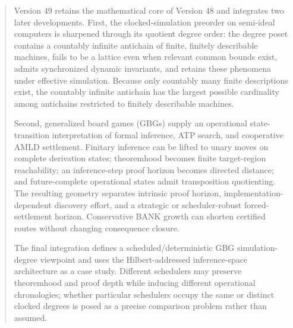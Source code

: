 \documentclass[11pt]{article}
\theoremstyle{remark}
\begin{document}
\begin{abstract}
Version 49 retains the mathematical core of Version 48 and integrates two later developments.
First, the clocked-simulation preorder on semi-ideal computers is sharpened through its quotient degree order:
the degree poset contains a countably infinite antichain of finite, finitely describable machines,
fails to be a lattice even when relevant common bounds exist,
admits synchronized dynamic invariants, and retains these phenomena under effective simulation.
Because only countably many finite descriptions exist, the countably infinite antichain has the largest
possible cardinality among antichains restricted to finitely describable machines.

Second, generalized board games (GBGs) supply an operational state-transition interpretation of
formal inference, ATP search, and cooperative AMLD settlement.
Finitary inference can be lifted to unary moves on complete derivation states;
theoremhood becomes finite target-region reachability;
an inference-step proof horizon becomes directed distance;
and future-complete operational states admit transposition quotienting.
The resulting geometry separates intrinsic proof horizon, implementation-dependent discovery effort,
and a strategic or scheduler-robust forced-settlement horizon.
Conservative BANK growth can shorten certified routes without changing consequence closure.

The final integration defines a scheduled/deterministic GBG simulation-degree viewpoint and uses
the Hilbert-addressed inference-space architecture as a case study.
Different schedulers may preserve theoremhood and proof depth while inducing different operational
chronologies; whether particular schedulers occupy the same or distinct clocked degrees is posed as a
precise comparison problem rather than assumed.
\end{abstract}
\end{document}
